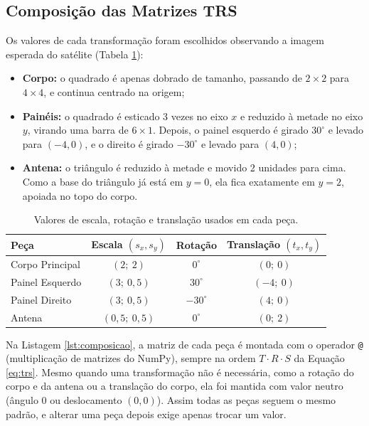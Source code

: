 \documentclass{article}
\begin{document}
\subsection{Composição das Matrizes TRS}

Os valores de cada transformação foram escolhidos observando a imagem esperada do satélite (Tabela \ref{tab:parametros}):

\begin{itemize}
    \item \textbf{Corpo:} o quadrado é apenas dobrado de tamanho, passando de $2\times2$ para $4\times4$, e continua centrado na origem;
    \item \textbf{Painéis:} o quadrado é esticado 3 vezes no eixo $x$ e reduzido à metade no eixo $y$, virando uma barra de $6\times1$. Depois, o painel esquerdo é girado $30^\circ$ e levado para $(-4, 0)$, e o direito é girado $-30^\circ$ e levado para $(4, 0)$;
    \item \textbf{Antena:} o triângulo é reduzido à metade e movido 2 unidades para cima. Como a base do triângulo já está em $y = 0$, ela fica exatamente em $y = 2$, apoiada no topo do corpo.
\end{itemize}

\begin{table}[H]
\centering
\caption{Valores de escala, rotação e translação usados em cada peça.}
\label{tab:parametros}
\begin{tabular}{lccc}
\toprule
\textbf{Peça} & \textbf{Escala $(s_x, s_y)$} & \textbf{Rotação} & \textbf{Translação $(t_x, t_y)$} \\
\midrule
Corpo Principal & $(2;\ 2)$         & $0^\circ$   & $(0;\ 0)$  \\
Painel Esquerdo & $(3;\ 0{,}5)$     & $30^\circ$  & $(-4;\ 0)$ \\
Painel Direito  & $(3;\ 0{,}5)$     & $-30^\circ$ & $(4;\ 0)$  \\
Antena          & $(0{,}5;\ 0{,}5)$ & $0^\circ$   & $(0;\ 2)$  \\
\bottomrule
\end{tabular}
\end{table}

Na Listagem \ref{lst:composicao}, a matriz de cada peça é montada com o operador \texttt{@} (multiplicação de matrizes do NumPy), sempre na ordem $T \cdot R \cdot S$ da Equação \ref{eq:trs}. Mesmo quando uma transformação não é necessária, como a rotação do corpo e da antena ou a translação do corpo, ela foi mantida com valor neutro (ângulo 0 ou deslocamento $(0, 0)$). Assim todas as peças seguem o mesmo padrão, e alterar uma peça depois exige apenas trocar um valor.
\end{document}
